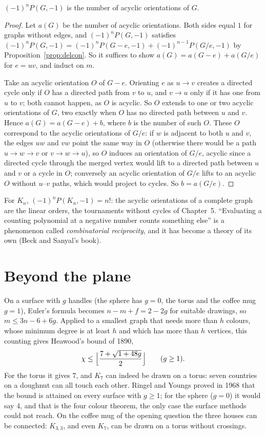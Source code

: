 \begin{theorem}[Stanley, 1973]\label{thm:stanley}
$(-1)^nP(G,-1)$ is the number of acyclic orientations of $G$.
\end{theorem}
\begin{proof}
Let $a(G)$ be the number of acyclic orientations. Both sides equal $1$ for graphs without edges, and $(-1)^nP(G,-1)$ satisfies $(-1)^nP(G,-1)=(-1)^nP(G-e,-1)+(-1)^{n-1}P(G/e,-1)$
by Proposition~\ref{prop:delcon}. So it suffices to show $a(G)=a(G-e)+a(G/e)$ for $e=uv$, and induct on $m$.

Take an acyclic orientation $O$ of $G-e$. Orienting $e$ as $u\to v$ creates a directed cycle only if $O$ has a directed path from $v$ to $u$, and $v\to u$ only if it has one from $u$
to $v$; both cannot happen, as $O$ is acyclic. So $O$ extends to one or two acyclic orientations of $G$, two exactly when $O$ has no directed path between $u$ and $v$. Hence
$a(G)=a(G-e)+b$, where $b$ is the number of such $O$. These $O$ correspond to the acyclic orientations of $G/e$: if $w$ is adjacent to both $u$ and $v$, the edges $uw$ and $vw$ point
the same way in $O$ (otherwise there would be a path $u\to w\to v$ or $v\to w\to u$), so $O$ induces an orientation of $G/e$, acyclic since a directed cycle through the merged vertex
would lift to a directed path between $u$ and $v$ or a cycle in $O$; conversely an acyclic orientation of $G/e$ lifts to an acyclic $O$ without $u$--$v$ paths, which would
project to cycles. So $b=a(G/e)$.
\end{proof}

For $K_n$, $(-1)^nP(K_n,-1)=n!$: the acyclic orientations of a complete graph are the linear orders, the tournaments without cycles of
Chapter~5. ``Evaluating a counting polynomial at a negative number counts something else'' is a phenomenon called \emph{combinatorial reciprocity},
and it has become a theory of its own (Beck and Sanyal's book).

\section{Beyond the plane}

On a surface with $g$ handles (the sphere has $g=0$, the torus and the coffee mug $g=1$), Euler's formula becomes $n-m+f=2-2g$ for suitable drawings,
so $m\le3n-6+6g$. Applied to a smallest graph that needs more than $h$ colours, whose minimum degree is at least $h$ and which has more than $h$ vertices,
this counting gives Heawood's bound of 1890,
\[
\chi\le\Bigl\lfloor\frac{7+\sqrt{1+48g}}2\Bigr\rfloor\qquad(g\ge1).
\]
For the torus it gives $7$, and $K_7$ can indeed be drawn on a torus: seven countries on a doughnut can all touch each other. Ringel
and Youngs proved in 1968 that the bound is attained on every surface with $g\ge1$; for the sphere ($g=0$) it would say $4$, and that is the four colour
theorem, the only case the surface methods could not reach. On the coffee mug of the opening question the three houses can be connected:
$K_{3,3}$, and even $K_7$, can be drawn on a torus without crossings.

